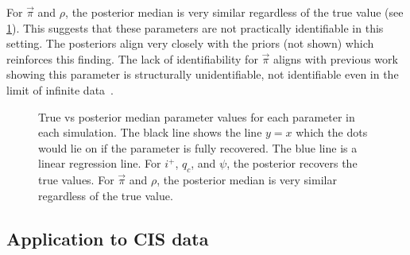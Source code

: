 \documentclass[thesis.tex]{subfiles}
\begin{document}
For $\vec{\pi}$ and $\rho$, the posterior median is very similar regardless of the true value (see \cref{SEIR:fig:true-vs-posterior}).
This suggests that these parameters are not practically identifiable in this setting.
The posteriors align very closely with the priors (not shown) which reinforces this finding.
The lack of identifiability for $\vec{\pi}$ aligns with previous work showing this parameter is structurally unidentifiable, \ie not identifiable even in the limit of infinite data~\autocite{dankwaStructural}.
\begin{figure}
    \caption[True vs posterior parameter values]{%
        True vs posterior median parameter values for each parameter in each simulation.
        The black line shows the line $y = x$ which the dots would lie on if the parameter is fully recovered.
        The blue line is a linear regression line.
        For $i^+$, $q_c$, and $\psi$, the posterior recovers the true values.
        For $\vec{\pi}$ and $\rho$, the posterior median is very similar regardless of the true value.
    }
    \label{SEIR:fig:true-vs-posterior}
\end{figure}

\subsection{Application to CIS data} \label{SEIR:sec:application}
\end{document}
